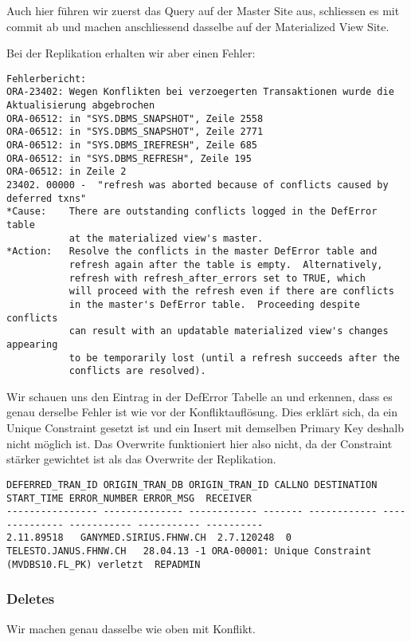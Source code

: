 \documentclass[11pt,a4paper,parskip=half]{scrartcl}
\begin{document}
Auch hier führen wir zuerst das Query auf der Master Site aus, schliessen es mit commit ab und machen anschliessend dasselbe auf der Materialized View Site.

Bei der Replikation erhalten wir aber einen Fehler:
\begin{lstlisting}
Fehlerbericht:
ORA-23402: Wegen Konflikten bei verzoegerten Transaktionen wurde die Aktualisierung abgebrochen
ORA-06512: in "SYS.DBMS_SNAPSHOT", Zeile 2558
ORA-06512: in "SYS.DBMS_SNAPSHOT", Zeile 2771
ORA-06512: in "SYS.DBMS_IREFRESH", Zeile 685
ORA-06512: in "SYS.DBMS_REFRESH", Zeile 195
ORA-06512: in Zeile 2
23402. 00000 -  "refresh was aborted because of conflicts caused by deferred txns"
*Cause:    There are outstanding conflicts logged in the DefError table
           at the materialized view's master.
*Action:   Resolve the conflicts in the master DefError table and
           refresh again after the table is empty.  Alternatively,
           refresh with refresh_after_errors set to TRUE, which
           will proceed with the refresh even if there are conflicts
           in the master's DefError table.  Proceeding despite conflicts
           can result with an updatable materialized view's changes appearing
           to be temporarily lost (until a refresh succeeds after the
           conflicts are resolved).
\end{lstlisting}

Wir schauen uns den Eintrag in der DefError Tabelle an und erkennen, dass es genau derselbe Fehler ist wie vor der Konfliktauflösung. Dies erklärt sich, da ein Unique Constraint gesetzt ist und ein Insert mit demselben Primary Key deshalb nicht möglich ist. Das Overwrite funktioniert hier also nicht, da der Constraint stärker gewichtet ist als das Overwrite der Replikation.
\begin{lstlisting}
DEFERRED_TRAN_ID ORIGIN_TRAN_DB ORIGIN_TRAN_ID CALLNO DESTINATION START_TIME ERROR_NUMBER ERROR_MSG  RECEIVER
---------------- -------------- ------------ ------- ------------ -------------- ----------- ----------- ----------
2.11.89518   GANYMED.SIRIUS.FHNW.CH  2.7.120248  0 TELESTO.JANUS.FHNW.CH   28.04.13 -1 ORA-00001: Unique Constraint (MVDBS10.FL_PK) verletzt  REPADMIN
\end{lstlisting}

\subsubsection{Deletes}
Wir machen genau dasselbe wie oben mit Konflikt.
\end{document}
